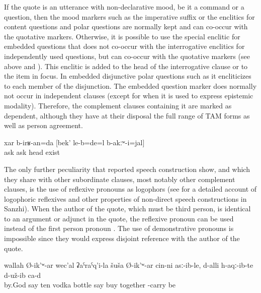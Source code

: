 If the quote is an utterance with non-declarative mood, be it a command or a question, then the mood markers such as the imperative suffix  or the enclitics for content questions  and polar questions  are normally kept and can co-occur with the quotative markers. Otherwise, it is possible to use the special enclitic for embedded questions that does not co-occur with the interrogative enclitics for independently used questions, but can co-occur with the quotative markers (see  above and ). This enclitic is added to the head of the interrogative clause or to the item in focus. In embedded disjunctive polar questions such as  it encliticizes to each member of the disjunction. The embedded question marker does normally not occur in independent clauses (except for when it is used to express epistemic modality). Therefore, the complement clauses containing it are marked as dependent, although they have at their disposal the full range of TAM forms as well as person agreement.
%
\begin{exe}
	\ex	\label{ex:‎‎‎There we will ask if he had a head or not}
	\gll	xar	b-irʁ-an=da	[bek'	le-b=de=l	b-akːʷ-i=jal]\\
		ask	ask	head	exist	\\
	\glt	{}
\end{exe}

The only further peculiarity that reported speech construction show, and which they share with other subordinate clauses, most notably other complement clauses, is the use of reflexive pronouns as logophors (see \citealp{ForkerSubmittedb} for a detailed account of logophoric reflexives and other properties of non-direct speech constructions in Sanzhi). When the author of the quote, which must be third person, is identical to an argument or adjunct in the quote, the reflexive pronoun can be used instead of the first person pronoun . The use of demonstrative pronouns is impossible since they would express disjoint reference with the author of the quote.
%
\begin{exe}
	\ex	\label{ex:‎‎‎By God, he said that he himself had bought 10 bottles of vodka; and apparently he had brought them with him}
	\gll	wallah		Ø-ik'ʷ-ar	wec'al	ʡaˁraˁq'i-la	šuša	Ø-ik'ʷ-ar	cin-ni	asː-ib-le,	d-alli	h-aqː-ib-te	d-už-ib	ca-d	\\
		by.God say	ten	vodka	bottle	say		buy	together	-carry 	be	\\
	\glt	{}
\end{exe}

